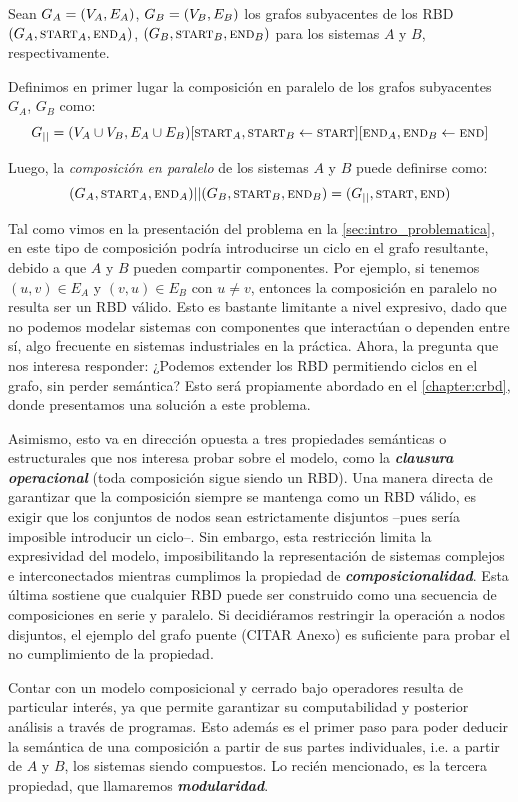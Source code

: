 Sean $G_{A}=(V_{A},E_{A})$, $G_{B}=(V_{B},E_{B})$ los grafos subyacentes de los RBD $(G_{A}, \textsc{start}_{A}, \textsc{end}_{A})$, $(G_{B}, \textsc{start}_{B}, \textsc{end}_{B})$ para los sistemas $A$ y $B$, respectivamente.

\begin{definition}
    Definimos en primer lugar la composición en paralelo de los grafos subyacentes $G_A$, $G_B$ como:
    \[G_{||} = (V_A \cup V_B, E_A \cup E_B)[\textsc{start}_A, \textsc{start}_B \leftarrow \textsc{start}][\textsc{end}_A, \textsc{end}_B \leftarrow \textsc{end}]\]

    Luego, la \textit{composición en paralelo} de los sistemas $A$ y $B$ puede definirse como:
\[
    (G_{A}, \textsc{start}_{A}, \textsc{end}_{A}) || (G_{B}, \textsc{start}_{B}, \textsc{end}_{B}) = (G_{||} , \textsc{start}, \textsc{end})
\]
\end{definition}

Tal como vimos en la presentación del problema en la \autoref{sec:intro_problematica}, en este tipo de composición podría introducirse un ciclo en el grafo resultante, debido a que $A$ y $B$ pueden compartir componentes. Por ejemplo, si tenemos $(u,v) \in E_A$ y $(v,u) \in E_B$ con $u \neq v$, entonces la composición en paralelo no resulta ser un RBD válido. Esto es bastante limitante a nivel expresivo, dado que no podemos modelar sistemas con componentes que interactúan o dependen entre sí, algo frecuente en sistemas industriales en la práctica.
Ahora, la pregunta que nos interesa responder: ¿Podemos extender los RBD permitiendo ciclos en el grafo, sin perder semántica? Esto será propiamente abordado en el \autoref{chapter:crbd}, donde presentamos una solución a este problema.  

Asimismo, esto va en dirección opuesta a tres propiedades semánticas o estructurales que nos interesa probar sobre el modelo, como la \textbf{\textit{clausura operacional}} (toda composición sigue siendo un RBD). Una manera directa de garantizar que la composición siempre se mantenga como un RBD válido, es exigir que los conjuntos de nodos sean estrictamente disjuntos --pues sería imposible introducir un ciclo--. Sin embargo, esta restricción limita la expresividad del modelo, imposibilitando la representación de sistemas complejos e interconectados mientras cumplimos la propiedad de \textbf{\textit{composicionalidad}}. Esta última sostiene que cualquier RBD puede ser construido como una secuencia de composiciones en serie y paralelo. Si decidiéramos restringir la operación a nodos disjuntos, el ejemplo del grafo puente (CITAR Anexo) es suficiente para probar el no cumplimiento de la propiedad. 

Contar con un modelo composicional y cerrado bajo operadores resulta de particular interés, ya que permite garantizar su computabilidad y posterior análisis a través de programas. Esto además es el primer paso para poder deducir la semántica de una composición a partir de sus partes individuales, i.e. a partir de $A$ y $B$, los sistemas siendo compuestos. Lo recién mencionado, es la tercera propiedad, que llamaremos \textbf{\textit{modularidad}}.

